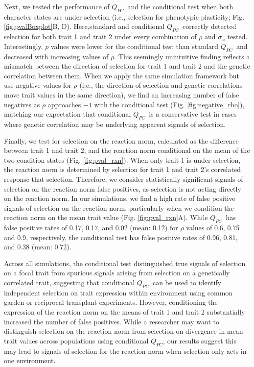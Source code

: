 \documentclass[11pt,letterpaper]{article}
\newcommand{\qpc}{$Q_{PC}$}
\begin{document}
Next, we tested the performance of \qpc\ and the conditional test when both character states are under selection (i.e., selection for phenotypic plasticity; Fig. \ref{fig:pvalBoxplot}B, D). 
Here,standard and conditional \qpc\ correctly detected selection for both trait 1 and trait 2 under every combination of $\rho$ and $\sigma_\omega$ tested. 
Interestingly, $p$ values were lower for the conditional test than standard \qpc\ and decreased with increasing values of $\rho$. This seemingly unintuitive finding reflects a mismatch between the direction of selection for trait 1 and trait 2 and the genetic correlation between them. 
When we apply the same simulation framework but use negative values for $\rho$ (i.e., the direction of selection and genetic correlations move trait values in the same direction), we find an increasing number of false negatives as $\rho$ approaches $-1$ with the conditional test (Fig. \ref{fig:negative_rho}), matching our expectation that conditional \qpc\ is a conservative test in cases where genetic correlation may be underlying apparent signals of selection.

Finally, we test for selection on the reaction norm, calculated as the difference between trait 1 and trait 2, and the reaction norm conditional on the mean of the two condition states (Fig. \ref{fig:pval_rxn}). 
When only trait 1 is under selection, the reaction norm is determined by selection for trait 1 and trait 2's correlated response that selection. Therefore, we consider statistically significant signals of selection on the reaction norm false positives, as selection is not acting directly on the reaction norm. In our simulations, we find a high rate of false positive signals of selection on the reaction norm, particularly when we condition the reaction norm on the mean trait value (Fig. \ref{fig:pval_rxn}A). 
While \qpc\ has false positive rates of 0.17, 0.17, and 0.02 (mean: 0.12) for $\rho$ values of 0.6, 0.75 and 0.9, respectively, the conditional test has false positive rates of 0.96, 0.81, and 0.38 (mean: 0.72). 

Across all simulations, the conditional test distinguished true signals of selection on a focal trait from spurious signals arising from selection on a genetically correlated trait, suggesting that conditional \qpc\ can be used to identify independent selection on trait expression within environment using common garden or reciprocal transplant experiments. 
However, conditioning the expression of the reaction norm on the means of trait 1 and trait 2 substantially increased the number of false positives.
While a researcher may want to distinguish selection on the reaction norm from selection on divergence in mean trait values across populations using conditional \qpc, our results suggest this may lead to signals of selection for the reaction norm when selection only acts in one environment.
\end{document}
